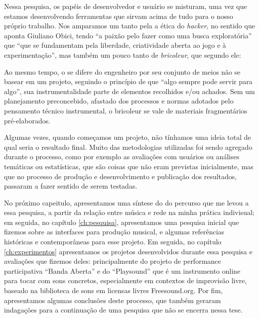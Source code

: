{%



Nessa pesquisa, os papéis de desenvolvedor e usuário se misturam, uma vez que estamos desenvolvendo ferramentas que sirvam acima de tudo para o nosso próprio trabalho. Nos amparamos um tanto pela a ética do \emph{hacker}, no sentido que aponta Giuliano Obici, tendo ``a paixão pelo fazer como uma busca exploratória'' que ``que se fundamentam pela liberdade, criatividade aberta ao jogo e à experimentação''\cite[366]{Obici2014}, mas também um pouco tanto de \emph{bricoleur}, que segundo ele:
\begin{citacao}
Ao mesmo tempo, o  se difere do engenheiro por seu conjunto de meios não se basear em um projeto, seguindo o princípio de que “algo sempre pode servir para algo”, sua instrumentalidade parte de elementos recolhidos e/ou achados. Sem um planejamento preconcebido, afastado dos processos e normas adotados pelo pensamento técnico instrumental, o bricoleur se vale de materiais fragmentários pré-elaborados. \cite[366]{Obici2014}
\end{citacao}

Algumas vezes, quando começamos um projeto, não tínhamos uma ideia total de qual seria o resultado final. Muito das metodologias utilizadas foi sendo agregado durante o processo, como por exemplo as avaliações com usuários ou análises temáticas ou estatísticas, que são coisas que não eram previstas inicialmente, mas que no processo de produção e desenvolvimento e publicação dos resultados, passaram a fazer sentido de serem testadas. 

No próximo capeitulo, apresentamos uma síntese do do percurso que me levou a essa pesquisa, a partir da relação entre música e rede na minha prática indivisual; em seguida, no capítulo \ref{ch:pesquisa}, apresentamos uma pesquisa inicial que fizemos sobre as interfaces para produção musical, e algumas referências históricas e contemporâneas para esse projeto. Em seguida, no capítulo \ref{ch:experimentos} apresentamos os projetos desenvolvidos durante essa pesquisa e avaliações que fizemos deles: principalmente do projeto de performance participativa ``Banda Aberta'' e do ``Playsound'' que é um instrumento online para tocar com sons concretos, especialmente em contextos de improvisão livre, baseado na biblioteca de sons em licensas livres Freesound.org. Por fim, apresentamos algumas conclusões deste processo, que também geraram indagações para a continuação de uma pesquisa que não se encerra nessa tese. 




}
